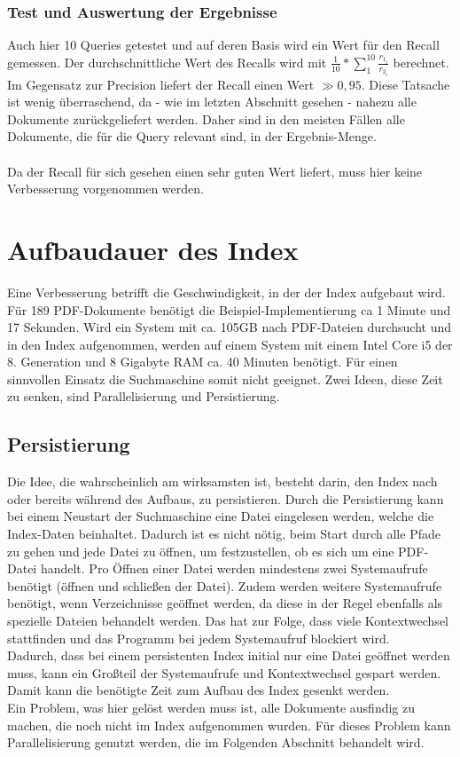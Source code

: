 \subsubsection{Test und Auswertung der Ergebnisse}
Auch hier 10 Queries getestet und auf deren Basis wird ein Wert für den Recall gemessen. 
Der durchschnittliche Wert des Recalls wird mit $\frac{1}{10} * \sum_{1}^{10} \frac{r_{1_i}}{r_{2_i}}$ berechnet.
\\
Im Gegensatz zur Precision liefert der Recall einen Wert $\gg 0,95$. Diese Tatsache ist wenig überraschend, da - wie im letzten Abschnitt gesehen - nahezu alle Dokumente zurückgeliefert werden. Daher sind in den meisten Fällen alle Dokumente, die für die Query relevant sind, in der Ergebnis-Menge.
\\
\\
Da der Recall für sich gesehen einen sehr guten Wert liefert, muss hier keine Verbesserung vorgenommen werden.

\section{Aufbaudauer des Index}
Eine Verbesserung betrifft die Geschwindigkeit, in der der Index aufgebaut wird. Für 189 PDF-Dokumente benötigt die Beispiel-Implementierung ca 1 Minute und 17 Sekunden.
Wird ein System mit ca. 105GB nach PDF-Dateien durchsucht und in den Index aufgenommen, werden auf einem System mit einem Intel Core i5 der 8. Generation und 8 Gigabyte RAM ca. 40 Minuten benötigt. Für einen sinnvollen Einsatz die Suchmaschine somit nicht geeignet. Zwei Ideen, diese Zeit zu senken, sind Parallelisierung und Persistierung.

\subsection{Persistierung}
Die Idee, die wahrscheinlich am wirksamsten ist, besteht darin, den Index nach oder bereits während des Aufbaus,  zu persistieren. Durch die Persistierung kann bei einem Neustart der Suchmaschine eine Datei eingelesen werden, welche die Index-Daten beinhaltet. Dadurch ist es nicht nötig, beim Start durch alle Pfade zu gehen und jede Datei zu öffnen, um festzustellen, ob es sich um eine PDF-Datei handelt. Pro Öffnen einer Datei werden mindestens zwei Systemaufrufe benötigt (öffnen und schließen der Datei). Zudem werden weitere Systemaufrufe benötigt, wenn Verzeichnisse geöffnet werden, da diese in der Regel ebenfalls als spezielle Dateien behandelt werden. Das hat zur Folge, dass viele Kontextwechsel stattfinden und das Programm bei jedem Systemaufruf blockiert wird.
\\
Dadurch, dass bei einem persistenten Index initial nur eine Datei geöffnet werden muss, kann ein Großteil der Systemaufrufe und Kontextwechsel gespart werden. Damit kann die benötigte Zeit zum Aufbau des Index gesenkt werden.
\\
Ein Problem, was hier gelöst werden muss ist, alle Dokumente ausfindig zu machen, die noch nicht im Index aufgenommen wurden. Für dieses Problem kann Parallelisierung genutzt werden, die im Folgenden Abschnitt behandelt wird.

